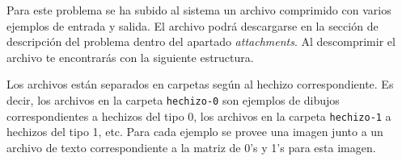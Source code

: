 \documentclass{oci}
\begin{document}
\begin{sampleDescription}
  Para este problema se ha subido al sistema un archivo comprimido con varios
  ejemplos de entrada y salida.
  El archivo podrá descargarse en la sección de descripción del problema dentro
  del apartado \emph{attachments}.
  Al descomprimir el archivo te encontrarás con la siguiente estructura.


  Los archivos están separados en carpetas según al hechizo correspondiente.
  Es decir, los archivos en la carpeta {\tt hechizo-0} son ejemplos de dibujos
  correspondientes a hechizos del tipo 0, los archivos en la carpeta {\tt hechizo-1} a
  hechizos del tipo 1, etc.
  Para cada ejemplo se provee una imagen junto a un archivo de texto
  correspondiente a la matriz de 0's y 1's para esta imagen.
  

\end{sampleDescription}
\end{document}
